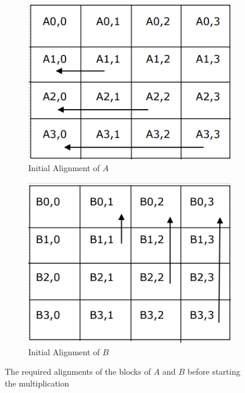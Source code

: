 \documentclass[12pt]{book}
\begin{document}
\begin{figure}[htbp]
    \centering
    \begin{subfigure}[b]{0.45\textwidth}
        \centering
        \includegraphics[width=\textwidth]{images/A_cannon_init.png}
        \caption{Initial Alignment of $A$}
        \label{fig:subfig1}
    \end{subfigure}
    \hfill
    \begin{subfigure}[b]{0.45\textwidth}
        \centering
        \includegraphics[width=\textwidth]{images/B_cannon_init.png}
        \caption{Initial Alignment of $B$}
        \label{fig:subfig2}
    \end{subfigure}
    \caption{The required alignments of the blocks of $A$ and $B$ before starting the multiplication}
    \label{fig:init_align}
\end{figure}
\end{document}
